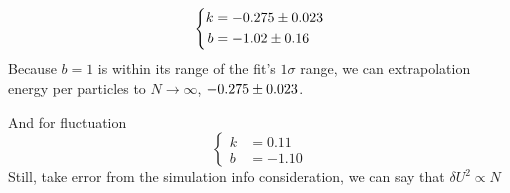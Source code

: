 \documentclass[UTF8,a4paper]{article}
\begin{document}
\begin{equation}
	\left\{
	\begin{aligned}
		k & = \num[separate-uncertainty = true]{-0.275+-0.023} \\
		b & = \num[separate-uncertainty = true]{-1.02+-0.16}
	\end{aligned}
	\right.
\end{equation}
Because $b=1$ is within its range of the fit's $1\sigma$ range, we can extrapolation energy per particles to $N\to \infty$, $\num[separate-uncertainty = true]{-0.275+-0.023}$.

And for fluctuation
\begin{equation}
	\left\{
	\begin{aligned}
		k & = 0.11  \\
		b & = -1.10
	\end{aligned}
	\right.
\end{equation}
Still, take error from the simulation info consideration, we can say that $\delta U^2\propto N$
\end{document}
